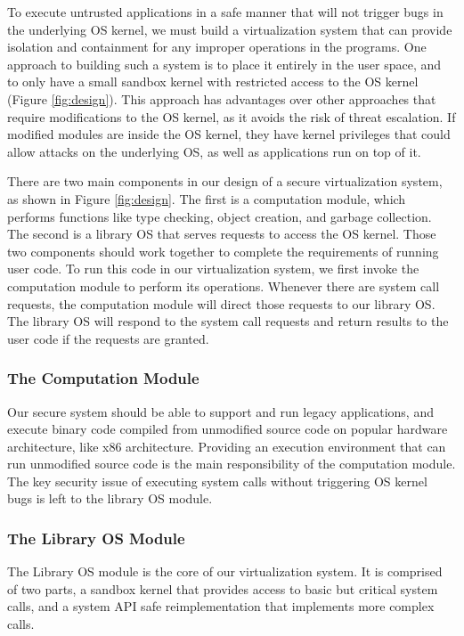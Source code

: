 To execute untrusted applications in a safe manner that will not trigger bugs 
in the underlying OS kernel, %
we must build a virtualization system that can provide isolation and 
containment for any improper operations in the programs. 
One approach to building such a system is to place it entirely in the user space, 
and to only have a small sandbox kernel with restricted access to the OS kernel (Figure \ref{fig:design}). 
This approach has advantages over other approaches that require modifications to 
the OS kernel, as it avoids the risk of threat escalation. If modified modules 
are inside the OS kernel, they have kernel privileges that could allow attacks on the underlying OS, 
as well as applications run on top of it. 

There are two main components in our design of a secure virtualization system, as shown in Figure \ref{fig:design}. 
The first is a computation module, which performs functions like type checking, object creation, 
and garbage collection. The second is a library OS that serves requests to access the OS kernel. 
Those two components should work together to complete the requirements of running user code. 
To run this code in our virtualization system, we first invoke the computation module to perform its operations. 
Whenever there are system call requests, 
the computation module will direct those requests to our library OS. 
The library OS will respond to the system call requests and return results to the user code if the requests are granted. 

\subsubsection{The Computation Module}

Our secure system should be able to support and run legacy applications, 
and execute binary code compiled from unmodified source code on popular hardware architecture, 
like x86 architecture. Providing an execution environment that can run unmodified source code is 
the main responsibility of the computation module. The key security issue of executing system calls 
without triggering OS kernel bugs is left to the library OS module.

\subsubsection{The Library OS Module}

The Library OS module is the core of our virtualization system. It is comprised of two parts, 
a sandbox kernel that provides access to basic but critical system calls, and a system 
API safe reimplementation that implements more complex calls. 

